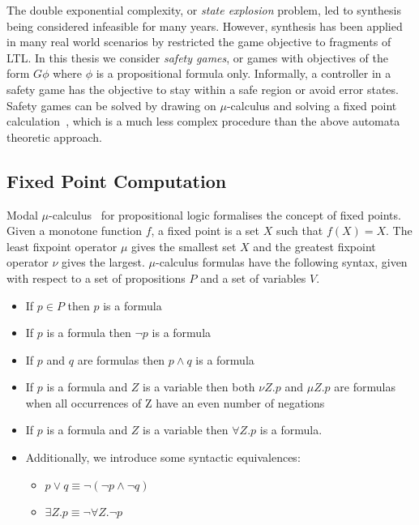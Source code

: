 The double exponential complexity, or \emph{state explosion} problem, led to synthesis being considered infeasible for many years. However, synthesis has been applied in many real world scenarios by restricted the game objective to fragments of LTL. In this thesis we consider \emph{safety games}, or games with objectives of the form $G \phi$ where $\phi$ is a propositional formula only. Informally, a controller in a safety game has the objective to stay within a safe region or avoid error states. Safety games can be solved by drawing on $\mu$-calculus and solving a fixed point calculation~\cite{Asarin95}, which is a much less complex procedure than the above automata theoretic approach.

\subsection{Fixed Point Computation}

Modal $\mu$-calculus~\cite{Kozen82} for propositional logic formalises the concept of fixed points. Given a monotone function $f$, a fixed point is a set $X$ such that $f(X) = X$. The least fixpoint operator $\mu$ gives the smallest set $X$ and the greatest fixpoint operator $\nu$ gives the largest. $\mu$-calculus formulas have the following syntax, given with respect to a set of propositions $P$ and a set of variables $V$.

\begin{itemize}
    \item If $p \in P$ then $p$ is a formula
    \item If $p$ is a formula then $\lnot p$ is a formula
    \item If $p$ and $q$ are formulas then $p \land q$ is a formula
    \item If $p$ is a formula and $Z$ is a variable then both $\nu Z . p$ and $\mu Z . p$ are formulas when all occurrences of Z have an even number of negations
    \item If $p$ is a formula and $Z$ is a variable then $\forall Z . p$ is a formula.
    \item Additionally, we introduce some syntactic equivalences:
        \begin{itemize}
            \item $p \lor q \equiv \lnot ( \lnot p \land \lnot q )$
            \item $\exists Z . p \equiv \lnot \forall Z . \lnot p$
        \end{itemize}
\end{itemize}

